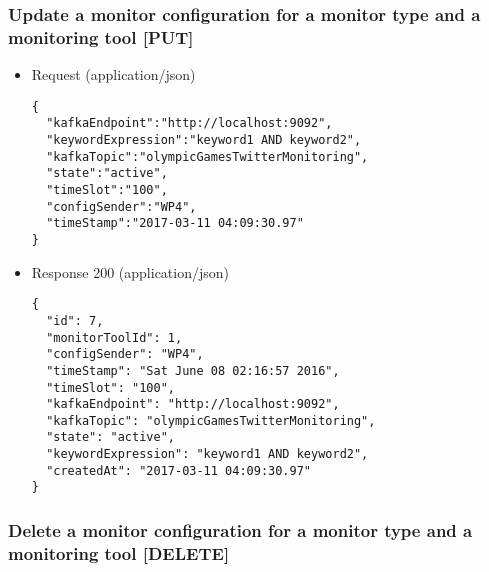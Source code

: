 \subsubsection{Update a monitor configuration for a monitor type and a
monitoring tool
{[}PUT{]}}\label{update-a-monitor-configuration-for-a-monitor-type-and-a-monitoring-tool-put}

\begin{itemize}
\item
  Request (application/json)

\begin{verbatim}
{
  "kafkaEndpoint":"http://localhost:9092",
  "keywordExpression":"keyword1 AND keyword2",
  "kafkaTopic":"olympicGamesTwitterMonitoring",
  "state":"active",
  "timeSlot":"100",
  "configSender":"WP4",
  "timeStamp":"2017-03-11 04:09:30.97"
}
\end{verbatim}
\item
  Response 200 (application/json)

\begin{verbatim}
{
  "id": 7,
  "monitorToolId": 1,
  "configSender": "WP4",
  "timeStamp": "Sat June 08 02:16:57 2016",
  "timeSlot": "100",
  "kafkaEndpoint": "http://localhost:9092",
  "kafkaTopic": "olympicGamesTwitterMonitoring",
  "state": "active",
  "keywordExpression": "keyword1 AND keyword2",
  "createdAt": "2017-03-11 04:09:30.97"
}
\end{verbatim}
\end{itemize}

\subsubsection{Delete a monitor configuration for a monitor type and a
monitoring tool
{[}DELETE{]}}\label{delete-a-monitor-configuration-for-a-monitor-type-and-a-monitoring-tool-delete}

